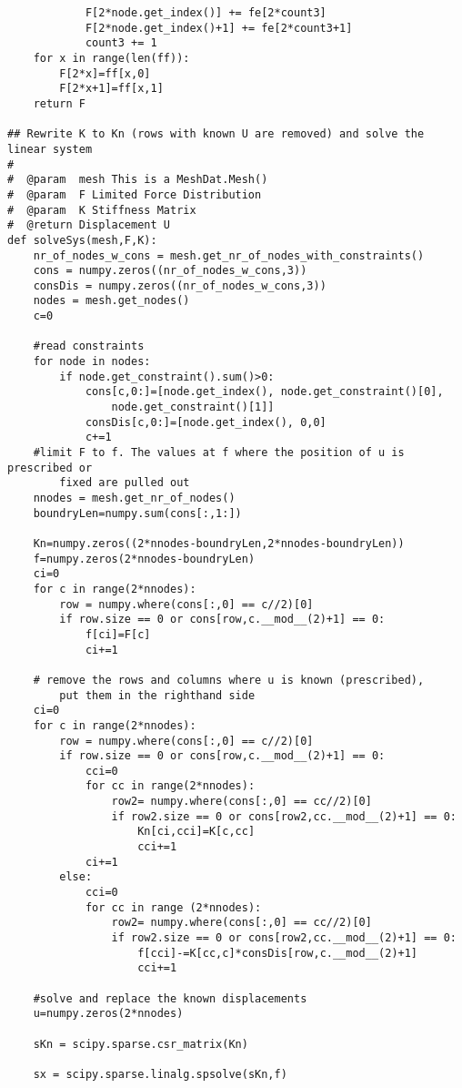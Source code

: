 \begin{appendices}
\begin{verbatim}
            F[2*node.get_index()] += fe[2*count3]
            F[2*node.get_index()+1] += fe[2*count3+1]
            count3 += 1
    for x in range(len(ff)):
        F[2*x]=ff[x,0]
        F[2*x+1]=ff[x,1]
    return F

## Rewrite K to Kn (rows with known U are removed) and solve the linear system
#
#  @param  mesh This is a MeshDat.Mesh()
#  @param  F Limited Force Distribution
#  @param  K Stiffness Matrix
#  @return Displacement U
def solveSys(mesh,F,K):
    nr_of_nodes_w_cons = mesh.get_nr_of_nodes_with_constraints()
    cons = numpy.zeros((nr_of_nodes_w_cons,3))
    consDis = numpy.zeros((nr_of_nodes_w_cons,3))
    nodes = mesh.get_nodes()
    c=0

    #read constraints
    for node in nodes:
        if node.get_constraint().sum()>0:
            cons[c,0:]=[node.get_index(), node.get_constraint()[0],
            	node.get_constraint()[1]]
            consDis[c,0:]=[node.get_index(), 0,0]
            c+=1
    #limit F to f. The values at f where the position of u is prescribed or 
    	fixed are pulled out
    nnodes = mesh.get_nr_of_nodes()
    boundryLen=numpy.sum(cons[:,1:])

    Kn=numpy.zeros((2*nnodes-boundryLen,2*nnodes-boundryLen))
    f=numpy.zeros(2*nnodes-boundryLen)
    ci=0
    for c in range(2*nnodes):
        row = numpy.where(cons[:,0] == c//2)[0]
        if row.size == 0 or cons[row,c.__mod__(2)+1] == 0:
            f[ci]=F[c]
            ci+=1

    # remove the rows and columns where u is known (prescribed), 
    	put them in the righthand side
    ci=0
    for c in range(2*nnodes):
        row = numpy.where(cons[:,0] == c//2)[0]
        if row.size == 0 or cons[row,c.__mod__(2)+1] == 0:
            cci=0
            for cc in range(2*nnodes):
                row2= numpy.where(cons[:,0] == cc//2)[0]
                if row2.size == 0 or cons[row2,cc.__mod__(2)+1] == 0:
                    Kn[ci,cci]=K[c,cc]
                    cci+=1
            ci+=1
        else:
            cci=0
            for cc in range (2*nnodes):
                row2= numpy.where(cons[:,0] == cc//2)[0]
                if row2.size == 0 or cons[row2,cc.__mod__(2)+1] == 0:
                    f[cci]-=K[cc,c]*consDis[row,c.__mod__(2)+1]
                    cci+=1

    #solve and replace the known displacements
    u=numpy.zeros(2*nnodes)

    sKn = scipy.sparse.csr_matrix(Kn)    
    
    sx = scipy.sparse.linalg.spsolve(sKn,f)


\end{verbatim}
\end{appendices}
